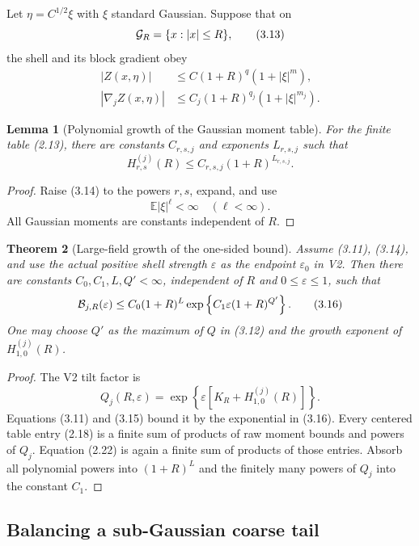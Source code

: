 \documentclass[11pt]{article}
\newtheorem{theorem}{Theorem}[section]
\newtheorem{lemma}[theorem]{Lemma}
\theoremstyle{remark}
\begin{document}
Let \(\eta=C^{1/2}\xi\) with \(\xi\) standard Gaussian.  Suppose that
on
\[
 {\cal G}_R=\{x:|x|\leq R\},                        \tag{3.13}
\]
the shell and its block gradient obey
\[
\begin{split}
 |Z(x,\eta)|
 &\leq C(1+R)^q(1+|\xi|^m),\\
 |\nabla_jZ(x,\eta)|
 &\leq C_j(1+R)^{q_j}(1+|\xi|^{m_j}).              \tag{3.14}
\end{split}
\]

\begin{lemma}[Polynomial growth of the Gaussian moment table]
\label{lem:v17v3-table}
For the finite table (2.13), there are constants
\(C_{r,s,j}\) and exponents \(L_{r,s,j}\) such that
\[
 H_{r,s}^{(j)}(R)
 \leq C_{r,s,j}(1+R)^{L_{r,s,j}}.                  \tag{3.15}
\]
\end{lemma}

\begin{proof}
Raise (3.14) to the powers \(r,s\), expand, and use
\[
 {\mathbb E}|\xi|^\ell<\infty
 \quad(\ell<\infty).
\]
All Gaussian moments are constants independent of \(R\).
\end{proof}

\begin{theorem}[Large-field growth of the one-sided bound]
\label{thm:v17v3-B-growth}
Assume (3.11), (3.14), and use the actual positive shell strength
\(\varepsilon\) as the endpoint \(\varepsilon_0\) in V2.  Then there
are constants \(C_0,C_1,L,Q'<\infty\), independent of \(R\) and
\(0\leq\varepsilon\leq1\), such that
\[
 {\cal B}_{j,R}(\varepsilon)
 \leq
 C_0(1+R)^L
 \exp\left\{
 C_1\varepsilon(1+R)^{Q'}
 \right\}.                                         \tag{3.16}
\]
One may choose \(Q'\) as the maximum of \(Q\) in (3.12) and the
growth exponent of \(H_{1,0}^{(j)}(R)\).
\end{theorem}

\begin{proof}
The V2 tilt factor is
\[
 Q_j(R,\varepsilon)
 =
 \exp\left\{
 \varepsilon[K_R+H_{1,0}^{(j)}(R)]
 \right\}.                                         \tag{3.17}
\]
Equations (3.11) and (3.15) bound it by the exponential in (3.16).
Every centered table entry (2.18) is a finite sum of products of
raw moment bounds and powers of \(Q_j\).  Equation (2.22) is again a
finite sum of products of those entries.  Absorb all polynomial
powers into \((1+R)^L\) and the finitely many powers of \(Q_j\) into
the constant \(C_1\).
\end{proof}

\subsection{Balancing a sub-Gaussian coarse tail}
\end{document}
